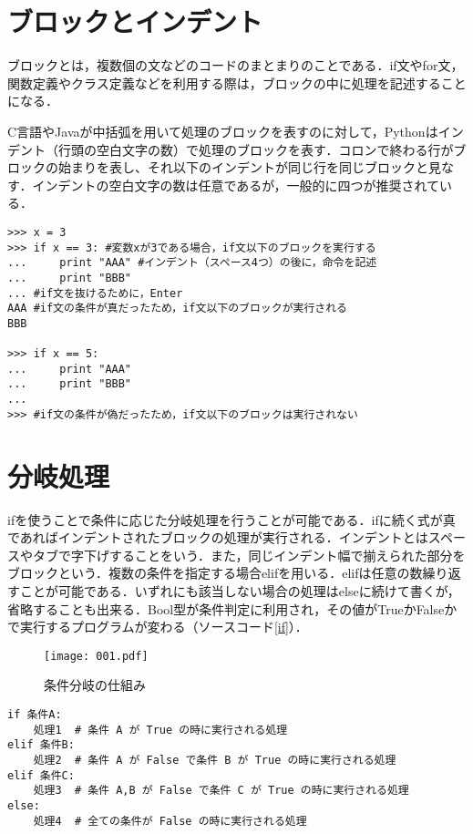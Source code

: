 \section{ブロックとインデント}
ブロックとは，複数個の文などのコードのまとまりのことである．if文やfor文，関数定義やクラス定義などを利用する際は，ブロックの中に処理を記述することになる．

C言語やJavaが中括弧を用いて処理のブロックを表すのに対して，Pythonはインデント（行頭の空白文字の数）で処理のブロックを表す．コロンで終わる行がブロックの始まりを表し、それ以下のインデントが同じ行を同じブロックと見なす．インデントの空白文字の数は任意であるが，一般的に四つが推奨されている．

\begin{lstlisting}[caption=インデント,label=indent]
>>> x = 3 
>>> if x == 3: #変数xが3である場合，if文以下のブロックを実行する
...     print "AAA" #インデント（スペース4つ）の後に，命令を記述
...     print "BBB" 
... #if文を抜けるために，Enter
AAA #if文の条件が真だったため，if文以下のブロックが実行される
BBB

>>> if x == 5: 
...     print "AAA" 
...     print "BBB"
...
>>> #if文の条件が偽だったため，if文以下のブロックは実行されない
\end{lstlisting}


\section{分岐処理}
ifを使うことで条件に応じた分岐処理を行うことが可能である．ifに続く式が真であればインデントされたブロックの処理が実行される．インデントとはスペースやタブで字下げすることをいう．また，同じインデント幅で揃えられた部分をブロックという．複数の条件を指定する場合elifを用いる．elifは任意の数繰り返すことが可能である．いずれにも該当しない場合の処理はelseに続けて書くが，省略することも出来る．Bool型が条件判定に利用され，その値がTrueかFalseかで実行するプログラムが変わる（ソースコード\ref{if}）．
\begin{figure}[htbp]
 \centering
  \texttt{[image: 001.pdf]}
  \caption{条件分岐の仕組み}
\end{figure}
\begin{lstlisting}[caption=ifの使い方,label=if]
if 条件A:
    処理1  # 条件 A が True の時に実行される処理
elif 条件B:
    処理2  # 条件 A が False で条件 B が True の時に実行される処理
elif 条件C:
    処理3  # 条件 A,B が False で条件 C が True の時に実行される処理
else:
    処理4  # 全ての条件が False の時に実行される処理
\end{lstlisting}

